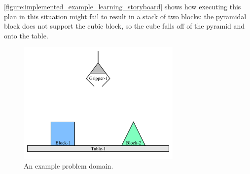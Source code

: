 {\mbox{\autoref{figure:implemented_example_learning_storyboard}}}
shows how executing this plan in this situation might fail to result
in a stack of two blocks: the pyramidal block does not support the
cubic block, so the cube falls off of the pyramid and onto the table.
\begin{figure}
\begin{center}
\includegraphics[width=8cm]{gfx/blocks_world_example-1}
\end{center}
\caption[An example problem domain.]{An example problem domain.}
\label{figure:an_example_problem_domain}
\end{figure}
